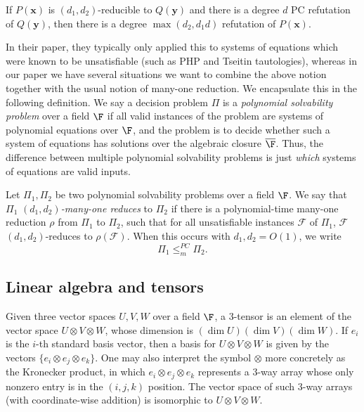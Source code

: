 \begin{lemma}
\label{lem:PCred}
If $P(\mathbf{x})$ is $(d_1, d_2)$-reducible to $Q(\mathbf{y})$ and there is
a degree $d$ PC refutation of $Q(\mathbf{y})$, then there is a degree $\max(d_2, d_1 d)$ 
refutation of $P(\mathbf x)$.
\end{lemma}

In their paper, they typically only applied this to systems of equations which were known to be unsatisfiable (such as PHP and Tseitin tautologies), whereas in our paper we have several situations we want to combine the above notion together with the usual notion of many-one reduction. We encapsulate this in the following definition. We say a decision problem $\Pi$ is a \emph{polynomial solvability problem} over a field $\F$ if all valid instances of the problem are systems of polynomial equations over $\F$, and the problem is to decide whether such a system of equations has solutions over the algebraic closure $\overline{\F}$. Thus, the difference between multiple polynomial solvability problems is just \emph{which} systems of equations are valid inputs.

\begin{definition} \label{def:reduction2}
Let $\Pi_1, \Pi_2$ be two polynomial solvability problems over a field $\F$. We say that $\Pi_1$ \emph{$(d_1,d_2)$-many-one reduces} to $\Pi_2$ if there is a polynomial-time many-one reduction $\rho$ from $\Pi_1$ to $\Pi_2$, such that for all unsatisfiable instances $\mathcal{F}$ of $\Pi_1$, $\mathcal{F}$ $(d_1, d_2)$-reduces to $\rho(\mathcal{F})$. When this occurs with $d_1,d_2 = O(1)$, we write \[\Pi_1 \leq_m^{PC} \Pi_2.\]
\end{definition}



\subsection{Linear algebra and tensors}
Given three vector spaces $U,V,W$ over a field $\F$, a 3-tensor is an element of the vector space $U \otimes V \otimes W$, whose dimension is $(\dim U)(\dim V)(\dim W)$. If $e_i$ is the $i$-th standard basis vector, then a basis for $U \otimes V \otimes W$ is given by the vectors $\{e_i \otimes e_j \otimes e_k\}$. One may also interpret the symbol $\otimes$ more concretely as the Kronecker product, in which $e_i \otimes e_j \otimes e_k$ represents a 3-way array whose only nonzero entry is in the $(i,j,k)$ position. The vector space of such 3-way arrays (with coordinate-wise addition) is isomorphic to $U \otimes V \otimes W$.

